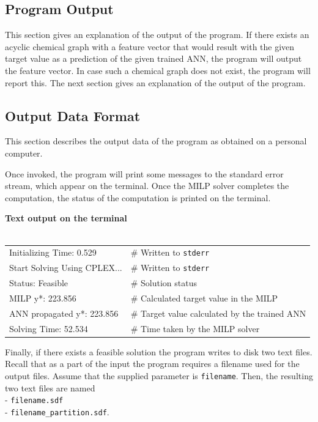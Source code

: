 \documentclass[11pt,titlepage,dvipdfmx,twoside]{book}
\begin{document}
\subsection{Program Output}
\label{sec:section3_3}

This section gives an explanation of the output of the program.
If there exists an acyclic chemical graph with a feature vector that
would result with the given target value as a prediction of
the given trained ANN, the program will output the feature vector.
In case such a chemical graph does not exist, the program will report this.
The next section gives an explanation of the output of the program.


\subsection{Output Data Format}
\label{sec:section3_4}

This section describes the output data of the program as
obtained on a personal computer.

Once invoked, the program will print some messages to the standard error
stream, which appear on the terminal.
Once the MILP solver completes the computation,
the status of the computation is printed on the terminal.

\bigskip

\begin{oframed}
{\bf Text output on the terminal}\\\\
\begin{tabular}{l l}
 Initializing Time: 0.529                &         \# Written to {\tt stderr} \\
Start Solving Using CPLEX...      &       \# Written to {\tt stderr} \\
Status: Feasible 				&       \# Solution status \\
MILP y*: 223.856 				&      \# Calculated target value in the MILP  \\
ANN propagated y*: 223.856     &      \# Target value calculated by the trained ANN  \\
Solving Time: 52.534                     &      \# Time taken by the MILP solver \\
\end{tabular}



\end{oframed}

Finally, if there exists a feasible solution the program writes to disk two text files.
Recall that as a part of the input the program requires a filename
used for the output files. 
Assume that the supplied parameter is {\tt filename}.
Then, the resulting two text files are named \\
- {\tt filename.sdf} \\
- {\tt filename\_partition.sdf}. 
\end{document}
